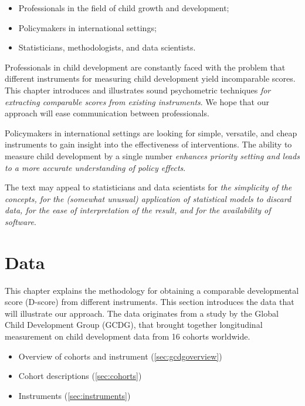 \documentclass[
]{book}
\providecommand{\tightlist}{%
  \setlength{\itemsep}{0pt}\setlength{\parskip}{0pt}}
\begin{document}
\begin{itemize}
\tightlist
\item
  Professionals in the field of child growth and development;
\item
  Policymakers in international settings;
\item
  Statisticians, methodologists, and data scientists.
\end{itemize}

Professionals in child development are constantly faced with the problem that different instruments for measuring child development yield incomparable scores. This chapter introduces and illustrates sound psychometric techniques \emph{for extracting comparable scores from existing instruments}. We hope that our approach will ease communication between professionals.

Policymakers in international settings are looking for simple, versatile, and cheap instruments to gain insight into the effectiveness of interventions. The ability to measure child development by a single number \emph{enhances priority setting and leads to a more accurate understanding of policy effects}.

The text may appeal to statisticians and data scientists for \emph{the simplicity of the concepts, for the (somewhat unusual) application of statistical models to discard data, for the ease of interpretation of the result, and for the availability of software}.

\hypertarget{ch:data}{%
\chapter{Data}\label{ch:data}}

This chapter explains the methodology for obtaining a comparable developmental score (D-score) from different instruments. This section introduces the data that will illustrate our approach. The data originates from a study by the Global Child Development Group (GCDG), that brought together longitudinal measurement on child development data from 16 cohorts worldwide.

\begin{itemize}
\tightlist
\item
  Overview of cohorts and instrument (\ref{sec:gcdgoverview})
\item
  Cohort descriptions (\ref{sec:cohorts})
\item
  Instruments (\ref{sec:instruments})
\end{itemize}
\end{document}
